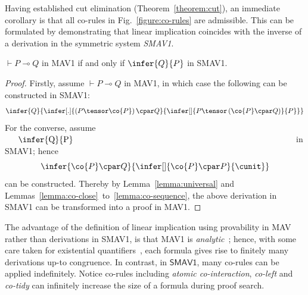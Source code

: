 \documentclass[UKenglish,acmsmall,authorversion]{acmart}
\theoremstyle{plain}
\begin{document}
Having established cut elimination (Theorem~\ref{theorem:cut}), an immediate corollary is that all co-rules in Fig.~\ref{figure:co-rules} are admissible. This can be formulated by demonstrating that linear implication coincides with the inverse of a derivation in the symmetric system \textit{SMAV1}.
\begin{corollary}
$\vdash P \multimap Q$ in \textsf{MAV1} if and only if $\infer{Q}{P}$ in \textsf{SMAV1}.
\end{corollary}
\begin{proof}
Firstly, assume $\vdash P \multimap Q$ in \textsf{MAV1},
in which case the following can be constructed in \textsf{SMAV1}: 
\[
\infer{
 Q
}{
\infer[.]{
 \left(P \tensor \co{P}\right) \cpar Q
}{
\infer[]{
 P \tensor \left(\co{P} \cpar Q\right)
}{
 P
}}}
\]
For the converse, assume $\vcenter{\infer{Q}{P}}$ in \textsf{SMAV1}; hence 
\[
\infer{
 \co{P} \cpar Q
}{\infer[]{
 \co{P} \cpar P
}{
 \cunit
}}
\] 
can be constructed.
Thereby by Lemma~\ref{lemma:universal} and Lemmas~\ref{lemma:co-close}~to~\ref{lemma:co-sequence},
the above derivation in \textsf{SMAV1} can be transformed into a proof in \textsf{MAV1}.
\end{proof}
The advantage of the definition of linear implication using provability in \textsf{MAV} rather than derivations in \textsf{SMAV1}, is that \textsf{MAV1} is \textit{analytic}~\cite{Bruscoli2009}; hence, with some care taken for existential quantifiers~\cite{Lincoln1994,Brunnler2003}, each formula gives rise to finitely many derivations up-to congruence. In contrast, in $\textsf{SMAV1}$, many co-rules can be applied indefinitely.
Notice co-rules including \textit{atomic co-interaction}, \textit{co-left} and \textit{co-tidy} can infinitely increase the size of a formula during proof search.
\end{document}
